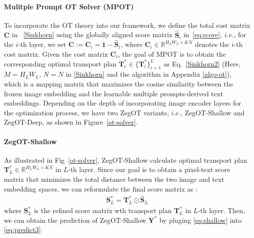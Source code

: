 \documentclass[nohyperref]{article}
\newcommand{\add}[1] {\textcolor{blue}{#1}} %
\newcommand{\bs}{\boldsymbol}
\newcommand{\asty}{{\mathbf{Y}^*}}
\theoremstyle{plain}
\theoremstyle{definition}
\theoremstyle{remark}
\begin{document}
\paragraph{Mulitple Prompt OT Solver (MPOT)}
To incorporate the OT theory into our framework, we define the total cost matrix $\bs{C}$ in ~\eqref{Sinkhorn} using the globally aligned score matrix $\bs{\hat S}_i$ in~\eqref{eq:score}, \textit{i.e.,} for the $i$-th layer, we set 
{$\bs{C} :=\bs{C}_i  = \bs{1 - \hat S}_i$,} where $\bs{C}_i \in \mathbb{R}^{H_LW_L \times K N}$ denotes the $i$-th cost matrix.
Given the cost matrix $\bs{C}_i$, the goal of MPOT is to obtain the corresponding optimal transport plan $\bs{T}^{\ast}_i  \in \{\bs{T}^{\ast}_i\}^L_{i=1}$ as Eq.~\eqref{Sinkhorn2}  {(Here, $M = H_LW_L$, $N= N$ in \eqref{Sinkhorn} and the algorithm in Appendix \ref{algo-ot})}, which is a mapping matrix that maximizes the cosine similarity between the frozen image embedding and the learnable multiple prompts-derived text embeddings.
Depending on the depth of incorporating image encoder layers for the optimization process, we have two ZegOT variants,  $\textit{i.e.,}$ ZegOT-Shallow and ZegOT-Deep, as shown in Figure~\ref{ot-solver}.

\paragraph{ZegOT-Shallow}
As illustrated in Fig~\ref{ot-solver}, ZegOT-Shallow calculate optimal transport plan $\bs{T}^{\ast}_L \in \mathbb{R}^{H_LW_L \times K N}$ in $L$-{th} layer. 
Since our goal is to obtain a pixel-text score matrix that minimizes the total distance between the two image and text embedding spaces, we can reformulate the final score matrix as : %
\begin{eqnarray}
\bs{S}^{\ast}_L= \bs{T}^{\ast}_L \odot\bs{\hat S}_L
\label{eq:shallow}
\end{eqnarray}
where $\bs{S}^{\ast}_L$ is the refined score matrix wth transport plan $\bs{T}^{\ast}_L$ in $L$-th layer. Then, we can obtain the prediction of ZegOT-Shallow $\asty$ by pluging \eqref{eq:shallow} into \eqref{eq:predict3}.
\end{document}
